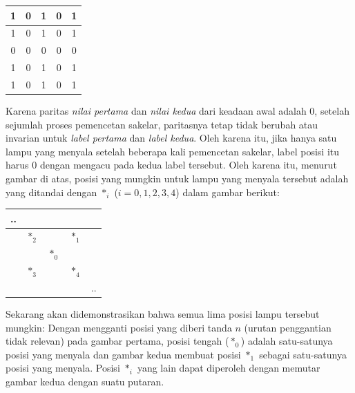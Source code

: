 \documentclass[12pt]{scrartcl}
\begin{document}
\begin{soaljawab}
\begin{solusi}
        \begin{center}
        \begin{tabular}{ |c|c|c|c|c| }
        \hline
        1 & 0 & 1 & 0 & 1 \\
        \hline
        1 & 0 & 1 & 0 & 1 \\
        \hline
        0 & 0 & 0 & 0 & 0 \\
        \hline
        1 & 0 & 1 & 0 & 1 \\
        \hline
        1 & 0 & 1 & 0 & 1 \\
        \hline
        \end{tabular}
        \end{center}
        Karena paritas \textit{nilai pertama} dan \textit{nilai kedua} dari keadaan awal adalah 0, setelah sejumlah proses pemencetan sakelar, paritasnya tetap tidak berubah atau invarian untuk \textit{label pertama} dan \textit{label kedua}. Oleh karena itu, jika hanya satu lampu yang menyala setelah beberapa kali pemencetan sakelar, label posisi itu harus 0 dengan mengacu pada kedua label tersebut. Oleh karena itu, menurut gambar di atas, posisi yang mungkin untuk lampu yang menyala tersebut adalah yang ditandai dengan $*_i$ ($i=0,1,2,3,4$) dalam gambar berikut:
        \begin{center}
        \begin{tabular}{ |c|c|c|c|c| }
        \hline
        ..&  &  &  &  \\
        \hline
        &  $*_2$ &  & $*_1$  &  \\
        \hline
        &  &  $*_0$ &  &  \\
        \hline
        & $*_3$ &  & $*_4 $&  \\
        \hline
        &  &  &  & .. \\
        \hline
        \end{tabular}
        \end{center}
        Sekarang akan didemonstrasikan bahwa semua lima posisi lampu tersebut mungkin:
        Dengan mengganti posisi yang diberi tanda $n$ (urutan penggantian tidak relevan) pada gambar pertama, posisi tengah ($*_0$) adalah satu-satunya posisi yang menyala dan gambar kedua membuat posisi $*_1$ sebagai satu-satunya posisi yang menyala. Posisi $*_i$ yang lain dapat diperoleh dengan memutar gambar kedua dengan suatu putaran.


\end{solusi}
\end{soaljawab}
\end{document}
